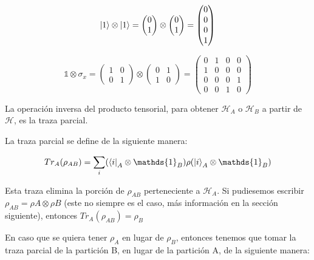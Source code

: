 \begin{equation*}
    \ket{1} \otimes \ket{1}
    = \begin{pmatrix} 0\\1 \end{pmatrix} \otimes \begin{pmatrix} 0\\1 \end{pmatrix}
    = \begin{pmatrix} 0\\0\\0\\1 \end{pmatrix}
\end{equation*}

\begin{equation*}
    \mathds{1} \otimes \sigma_x
    = \begin{pmatrix}
        1 & 0 \\
        0 & 1
        \end{pmatrix} \otimes
        \begin{pmatrix}
            0 & 1 \\
            1 & 0
        \end{pmatrix}
    = \begin{pmatrix}
        0 & 1 & 0 & 0 \\
        1 & 0 & 0 & 0 \\
        0 & 0 & 0 & 1 \\
        0 & 0 & 1 & 0
    \end{pmatrix}
\end{equation*}

La operación inversa del producto tensorial, para obtener $\mathcal{H}_A$ o $\mathcal{H}_B$ a partir de $\mathcal{H}$, es la traza parcial.

La traza parcial se define de la siguiente manera:

\begin{equation}
    Tr_A(\rho_{A B}) = \sum\limits_i (\bra{i}_A \otimes \mathds{1}_B) \rho (\ket{i}_A \otimes \mathds{1}_B)
\end{equation}

Esta traza elimina la porción de $\rho_{A B}$ perteneciente a $\mathcal{H}_A$. Si pudiesemos escribir $\rho_{A B} = \rho{A} \otimes \rho{B}$ (este no siempre es el caso, más información en la sección siguiente), entonces $Tr_A(\rho_{A B}) = \rho_B$

En caso que se quiera tener $\rho_A$ en lugar de $\rho_B$, entonces tenemos que tomar la traza parcial de la partición B, en lugar de la partición A, de la siguiente manera:

